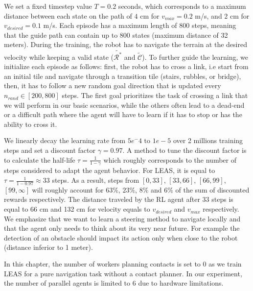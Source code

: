 We set a fixed timestep value $T =0.2$ seconds, which corresponds to a maximum distance between each state on the path of $4$ cm for $v_{max}=0.2$ m/s, and $2$ cm for $v_{desired}=0.1$ m/s.
Each episode has a maximum length of $800$ steps, meaning that the guide path can contain up to $800$ states (maximum distance of 32 meters). 
During the training, the robot has to navigate the terrain at the desired velocity while keeping a valid state ($\tilde{\mathcal{R}^*}$ and $\tilde{\mathcal{C}}$).
To further guide the learning, we initialize each episode as follows: first, the robot has to cross a link, i.e start from an initial tile and navigate through a transition tile (stairs, rubbles, or bridge), then, it has to follow a new random goal direction that is updated every $n_{rand} \in [200,800]$ steps.
The first goal prioritizes the task of crossing a link that we will perform in our basic scenarios, while the others often lead to a dead-end or a difficult path where the agent will have to learn if it has to stop or has the ability to cross it.

We linearly decay the learning rate from $5e^-4$ to $1e-5$ over 2 millions training steps and set a discount factor $\gamma = 0.97$. 
A method to tune the discount factor is to calculate the half-life $\tau = \frac{1}{1-\gamma}$ which roughly corresponds to the number of steps considered to adapt the agent behavior. For LEAS, it is equal to $\tau = \frac{1}{1-0.97} \approx 33$ steps. 
As a result, steps from $[0,33]$, $[33,66]$, $[66,99]$, $[99,\infty]$ will roughly account for $63\%$, $23\%$, $8\%$ and $6\%$ of the sum of discounted rewards respectively. 
The distance traveled by the RL agent after 33 steps is equal to 66 cm and 132 cm for velocity equals to $v_{desired}$ and $v_{max}$ respectively.
We emphasize that we want to learn a steering method to navigate locally and that the agent only needs to think about its very near future. For example the detection of an obstacle should impact its action only when close to the robot (distance inferior to 1 meter).

In this chapter, the number of workers planning contacts is set to 0 as we train LEAS for a pure navigation task without a contact planner. In our experiment, the number of parallel agents is limited to 6 due to hardware limitations.

